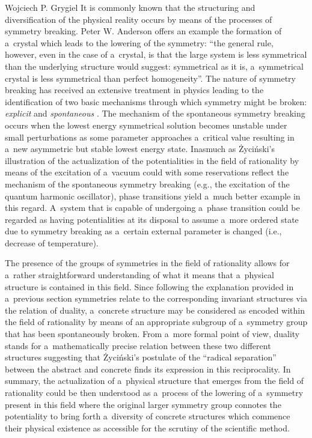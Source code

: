 \begin{artengenv}{Wojciech P. Grygiel}
It is commonly known that the structuring and diversification of the physical reality occurs by means of the processes of symmetry breaking. Peter W. Anderson 
\parencite*[][p.395]{anderson_more_1972} %
 offers an example the formation of a~crystal which leads to the lowering of the symmetry: ``the general rule, however, even in the case of a~crystal, is that the large system is less symmetrical than the underlying structure would suggest: symmetrical as it is, a~symmetrical crystal is less symmetrical than perfect homogeneity''. The nature of symmetry breaking has received an extensive treatment in physics leading to the identification of two basic mechanisms through which symmetry might be broken: \textit{explicit} and \textit{spontaneous} 
\parencite[e.g][]{brading_meaning_2003}. %
 The mechanism of the spontaneous symmetry breaking occurs when the lowest energy symmetrical solution becomes unstable under small perturbations as some parameter approaches a~critical value resulting in a~new asymmetric but stable lowest energy state. Inasmuch as Życiński's illustration of the actualization of the potentialities in the field of rationality by means of the excitation of a~vacuum could with some reservations reflect the mechanism of the spontaneous symmetry breaking (e.g., the excitation of the quantum harmonic oscillator), phase transitions yield a~much better example in this regard. A~system that is capable of undergoing a~phase transition could be regarded as having potentialities at its disposal to assume a~more ordered state due to symmetry breaking as a~certain external parameter is changed (i.e., decrease of temperature).



The presence of the groups of symmetries in the field of rationality allows for a~rather straightforward understanding of what it means that a~physical structure is contained in this field. Since following the explanation provided in a~previous section symmetries relate to the corresponding invariant structures via the relation of duality, a~concrete structure may be considered as encoded within the field of rationality by means of an appropriate subgroup of a~symmetry group that has been spontaneously broken. From a~more formal point of view, duality stands for a~mathematically precise relation between these two different structures suggesting that Życiński's postulate of the ``radical separation'' between the abstract and concrete finds its expression in this reciprocality. In summary, the actualization of a~physical structure that emerges from the field of rationality could be then understood as a~process of the lowering of a~symmetry present in this field where the original larger symmetry group connotes the potentiality to bring forth a~diversity of concrete structures which commence their physical existence as accessible for the scrutiny of the scientific method.




\end{artengenv}
